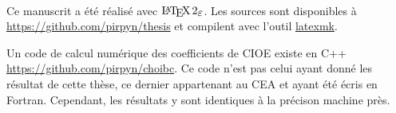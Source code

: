 ~{}

Ce manuscrit a été réalisé avec \(\LaTeXe\).
Les sources sont disponibles à \url{https://github.com/pirpyn/thesis} et compilent avec l'outil \href{https://mg.readthedocs.io/latexmk.html}{latexmk}. 

Un code de calcul numérique des coefficients de CIOE existe en C++ \url{https://github.com/pirpyn/choibc}.
Ce code n'est pas celui ayant donné les résultat de cette thèse, ce dernier appartenant au CEA et ayant été écris en Fortran. Cependant, les résultats y sont identiques à la précison machine près.

